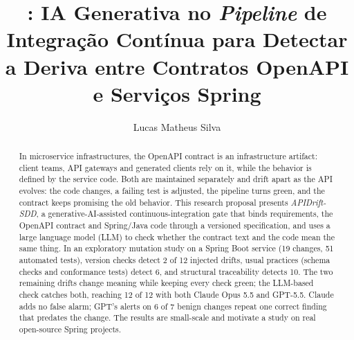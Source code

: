 \documentclass[12pt]{article}
\title{\proj: IA Generativa no \textit{Pipeline} de Integração Contínua para Detectar a Deriva entre Contratos OpenAPI e Serviços Spring}
\author{Lucas Matheus Silva\inst{1}}
\newcommand{\proj}{APIDrift-SDD}
\begin{document}
\maketitle
\sloppy

\begin{abstract}
In microservice infrastructures, the OpenAPI contract is an infrastructure artifact: client teams, API gateways and generated clients rely on it, while the behavior is defined by the service code. Both are maintained separately and drift apart as the API evolves: the code changes, a failing test is adjusted, the pipeline turns green, and the contract keeps promising the old behavior. This research proposal presents \textit{\proj}, a generative-AI-assisted continuous-integration gate that binds requirements, the OpenAPI contract and Spring/Java code through a versioned specification, and uses a large language model (LLM) to check whether the contract text and the code mean the same thing. In an exploratory mutation study on a Spring Boot service (19 changes, 51 automated tests), version checks detect 2 of 12 injected drifts, usual practices (schema checks and conformance tests) detect 6, and structural traceability detects 10. The two remaining drifts change meaning while keeping every check green; the LLM-based check catches both, reaching 12 of 12 with both Claude Opus 5.5 and GPT-5.5. Claude adds no false alarm; GPT's alerts on 6 of 7 benign changes repeat one correct finding that predates the change. The results are small-scale and motivate a study on real open-source Spring projects.
\end{abstract}
\end{document}
